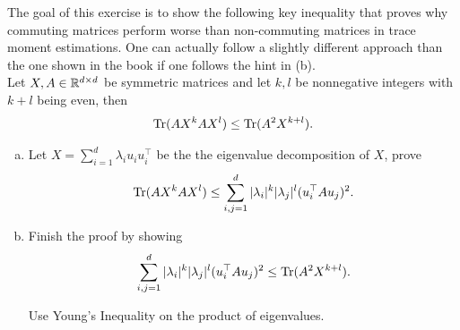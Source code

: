 \begin{myexercise}\label{prob:trace_commutativity_ineq}
    The goal of this exercise is to show the following key inequality that proves why commuting matrices perform worse than non-commuting matrices in trace moment estimations. One can actually follow a slightly different approach than the one shown in the book if one follows the hint in (b).
    \\
    Let $X,A \in \mathbb{R}^{d \times d}$ be symmetric matrices and let $k,l$ be nonnegative integers with $k+l$ being even, then 
    $$ \operatorname{Tr}( AX^{k}AX^{l}) \leq \operatorname{Tr}(A^2X^{k+l}).$$
    \begin{enumerate}[(a)]
        \item Let $X = \sum_{i=1}^d \lambda_i u_i u_i^\top$ be the the eigenvalue decomposition of $X$, prove
        $$ \operatorname{Tr}( AX^{k}AX^{l}) \leq \sum_{i,j=1}^d |\lambda_i|^k |\lambda_j|^l (u_i^\top A u_j)^2.$$
        \item Finish the proof by showing
        $$ \sum_{i,j=1}^d |\lambda_i|^k |\lambda_j|^l (u_i^\top A u_j)^2 \leq \operatorname{Tr}(A^2X^{k+l}). $$
        \begin{hint}
        Use Young's Inequality on the product of eigenvalues.
        \end{hint}
    \end{enumerate}
\end{myexercise}

